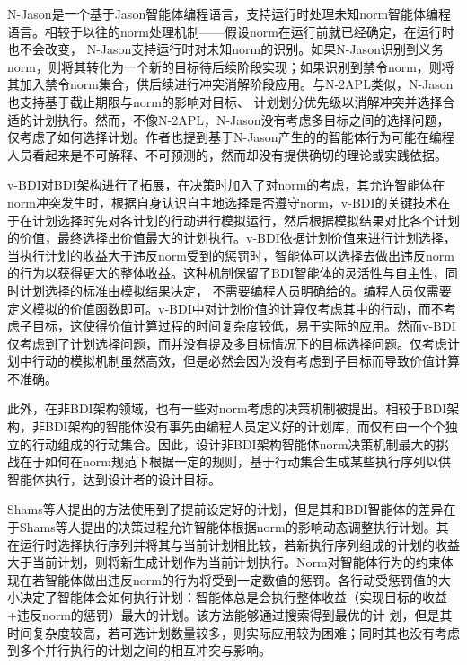 N-Jason\cite{DBLP:conf/dalt/LeePLDA14}是一个基于Jason\cite{bordini2007programming}智能体编程语言，支持运行时处理未知norm智能体编程语言。相较于以往的norm处理机制——假设norm在运行前就已经确定，在运行时也不会改变， N-Jason支持运行时对未知norm的识别。如果N-Jason识别到义务norm，则将其转化为一个新的目标待后续阶段实现；如果识别到禁令norm，则将其加入禁令norm集合，供后续进行冲突消解阶段应用。与N-2APL类似，N-Jason 也支持基于截止期限与norm的影响对目标、 计划划分优先级以消解冲突并选择合适的计划执行。然而，不像N-2APL，N-Jason没有考虑多目标之间的选择问题，仅考虑了如何选择计划。作者也提到基于N-Jason产生的的智能体行为可能在编程人员看起来是不可解释、不可预测的，然而却没有提供确切的理论或实践依据。

v-BDI\cite{DBLP:journals/eaai/MeneguzziROVL15}对BDI架构进行了拓展，在决策时加入了对norm的考虑，其允许智能体在norm冲突发生时，根据自身认识自主地选择是否遵守norm，v-BDI的关键技术在于在计划选择时先对各计划的行动进行模拟运行，然后根据模拟结果对比各个计划的价值，最终选择出价值最大的计划执行。v-BDI依据计划价值来进行计划选择， 当执行计划的收益大于违反norm受到的惩罚时，智能体可以选择去做出违反norm的行为以获得更大的整体收益。这种机制保留了BDI智能体的灵活性与自主性，同时计划选择的标准由模拟结果决定， 不需要编程人员明确给的。编程人员仅需要定义模拟的价值函数即可。v-BDI中对计划价值的计算仅考虑其中的行动，而不考虑子目标，这使得价值计算过程的时间复杂度较低，易于实际的应用。然而v-BDI仅考虑到了计划选择问题，而并没有提及多目标情况下的目标选择问题。仅考虑计划中行动的模拟机制虽然高效，但是必然会因为没有考虑到子目标而导致价值计算不准确。

此外，在非BDI架构领域，也有一些对norm考虑的决策机制被提出。相较于BDI架构，非BDI架构的智能体没有事先由编程人员定义好的计划库，而仅有由一个个独立的行动组成的行动集合。因此，设计非BDI架构智能体norm决策机制最大的挑战在于如何在norm规范下根据一定的规则，基于行动集合生成某些执行序列以供智能体执行，达到设计者的设计目标。

%
Shams等人\cite{DBLP:conf/atal/ShamsVPV15}提出的方法使用到了提前设定好的计划，但是其和BDI智能体的差异在于Shams等人提出的决策过程允许智能体根据norm的影响动态调整执行计划。其在运行时选择执行序列并将其与当前计划相比较，若新执行序列组成的计划的收益大于当前计划，则将新生成计划作为当前计划执行。Norm对智能体行为的约束体现在若智能体做出违反norm的行为将受到一定数值的惩罚。各行动受惩罚值的大小决定了智能体会如何执行计划：智能体总是会执行整体收益（实现目标的收益+违反norm的惩罚）最大的计划。该方法能够通过搜索得到最优的计 划，但是其时间复杂度较高，若可选计划数量较多，则实际应用较为困难；同时其也没有考虑到多个并行执行的计划之间的相互冲突与影响。

